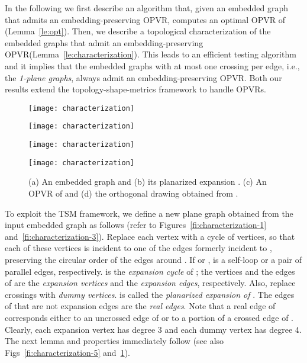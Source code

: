 \documentclass{article}
\newcommand{\opvr}{OPVR\xspace}
\begin{document}
In the following we first describe an algorithm that, given an embedded graph  that admits an embedding-preserving \opvr, computes an optimal \opvr of  (Lemma~\ref{le:opt}). Then, we describe a topological characterization of the embedded graphs that admit an embedding-preserving \opvr (Lemma~\ref{le:characterization}). This leads to an efficient testing algorithm and it implies that the embedded graphs with at most one crossing per edge, i.e., the \emph{1-plane graphs}, always admit an embedding-preserving \opvr. Both our results extend the topology-shape-metrics framework to handle {\opvr}s. 
 

\begin{figure}[tb]
\centering
    \begin{minipage}[b]{.48\textwidth}
    	\centering
    	\texttt{[image: characterization]}
    	\subcaption{}\label{fi:characterization-1}
    \end{minipage}
    \begin{minipage}[b]{.48\textwidth}
    	\centering
    	\texttt{[image: characterization]}
    	\subcaption{}\label{fi:characterization-3}
    \end{minipage}
    \begin{minipage}[b]{.48\textwidth}
    	\centering
    	\texttt{[image: characterization]}
    	\subcaption{}\label{fi:characterization-5}
    \end{minipage}
    \begin{minipage}[b]{.48\textwidth}
    	\centering
    	\texttt{[image: characterization]}
    	\subcaption{}\label{fi:characterization-6}
    \end{minipage}
    \caption{(a) An embedded graph  and (b) its planarized expansion .  (c) An \opvr  of  and (d) the orthogonal drawing  obtained from .}
\end{figure}

\smallskip {} To exploit the TSM framework, we define a new plane graph  obtained from the input embedded graph  as follows (refer to Figures~\ref{fi:characterization-1} and~\ref{fi:characterization-3}). Replace each vertex  with a cycle  of  vertices, so that each of these vertices is incident to one of the edges formerly incident to , preserving the circular order of the edges around . If  or ,  is a self-loop or a pair of parallel edges, respectively.  is the \emph{expansion cycle} of ; the vertices and the edges of  are the \emph{expansion vertices} and the \emph{expansion edges}, respectively. Also, replace crossings with \emph{dummy vertices}.  is called the \emph{planarized expansion of }. The edges of  that are not expansion edges are the \emph{real edges}. Note that a real edge of  corresponds either to an  uncrossed edge of  or to a portion of a crossed edge of . Clearly, each expansion vertex has degree 3 and each dummy vertex has degree 4.  The next lemma and properties immediately follow (see also Figs~\ref{fi:characterization-5} and~\ref{fi:characterization-6}).
\end{document}
